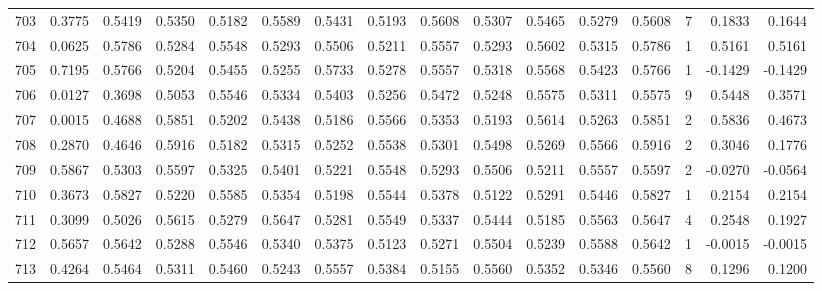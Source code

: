 \begin{tabular}{lrrrrrrrrrrrrrrr}
703 &      0.3775 &  0.5419 &  0.5350 &  0.5182 &  0.5589 &  0.5431 &  0.5193 &  0.5608 &  0.5307 &  0.5465 &   0.5279 &     0.5608 &      7 &                    0.1833 &                     0.1644 \\
704 &      0.0625 &  0.5786 &  0.5284 &  0.5548 &  0.5293 &  0.5506 &  0.5211 &  0.5557 &  0.5293 &  0.5602 &   0.5315 &     0.5786 &      1 &                    0.5161 &                     0.5161 \\
705 &      0.7195 &  0.5766 &  0.5204 &  0.5455 &  0.5255 &  0.5733 &  0.5278 &  0.5557 &  0.5318 &  0.5568 &   0.5423 &     0.5766 &      1 &                   -0.1429 &                    -0.1429 \\
706 &      0.0127 &  0.3698 &  0.5053 &  0.5546 &  0.5334 &  0.5403 &  0.5256 &  0.5472 &  0.5248 &  0.5575 &   0.5311 &     0.5575 &      9 &                    0.5448 &                     0.3571 \\
707 &      0.0015 &  0.4688 &  0.5851 &  0.5202 &  0.5438 &  0.5186 &  0.5566 &  0.5353 &  0.5193 &  0.5614 &   0.5263 &     0.5851 &      2 &                    0.5836 &                     0.4673 \\
708 &      0.2870 &  0.4646 &  0.5916 &  0.5182 &  0.5315 &  0.5252 &  0.5538 &  0.5301 &  0.5498 &  0.5269 &   0.5566 &     0.5916 &      2 &                    0.3046 &                     0.1776 \\
709 &      0.5867 &  0.5303 &  0.5597 &  0.5325 &  0.5401 &  0.5221 &  0.5548 &  0.5293 &  0.5506 &  0.5211 &   0.5557 &     0.5597 &      2 &                   -0.0270 &                    -0.0564 \\
710 &      0.3673 &  0.5827 &  0.5220 &  0.5585 &  0.5354 &  0.5198 &  0.5544 &  0.5378 &  0.5122 &  0.5291 &   0.5446 &     0.5827 &      1 &                    0.2154 &                     0.2154 \\
711 &      0.3099 &  0.5026 &  0.5615 &  0.5279 &  0.5647 &  0.5281 &  0.5549 &  0.5337 &  0.5444 &  0.5185 &   0.5563 &     0.5647 &      4 &                    0.2548 &                     0.1927 \\
712 &      0.5657 &  0.5642 &  0.5288 &  0.5546 &  0.5340 &  0.5375 &  0.5123 &  0.5271 &  0.5504 &  0.5239 &   0.5588 &     0.5642 &      1 &                   -0.0015 &                    -0.0015 \\
713 &      0.4264 &  0.5464 &  0.5311 &  0.5460 &  0.5243 &  0.5557 &  0.5384 &  0.5155 &  0.5560 &  0.5352 &   0.5346 &     0.5560 &      8 &                    0.1296 &                     0.1200 \\

\end{tabular}
